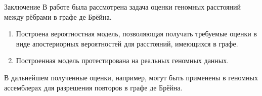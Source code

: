 \documentclass[unicode, notheorems]{beamer}
\begin{document}
\begin{frame}{Заключение}
	В работе была рассмотрена задача оценки геномных расстояний между рёбрами в графе де Брёйна.
	\bigskip
	\begin{enumerate}
		\item Построена вероятностная модель, позволяющая получать требуемые оценки в виде апостериорных вероятностей для расстояний, имеющихся в графе.
		\item Построенная модель протестирована на реальных геномных данных.
	\end{enumerate}
	\bigskip
	В дальнейшем полученные оценки, например, могут быть применены в геномных ассемблерах для разрешения повторов в графе де Брёйна. 
\end{frame}
\end{document}
